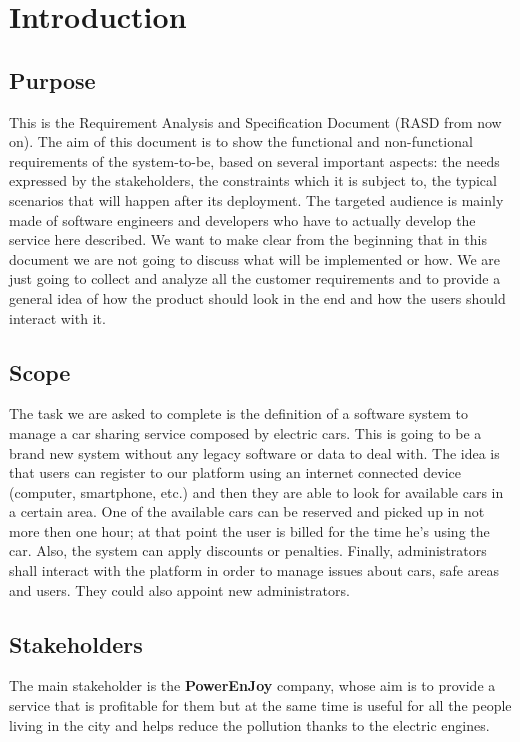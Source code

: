 \section{Introduction}

\subsection{Purpose}
    This is the Requirement Analysis and Specification Document (RASD from now on).
    The aim of this document is to show the functional and non-functional requirements
    of the system-to-be, based on several important aspects:
    the needs expressed by the stakeholders, the constraints which it is subject to,
    the typical scenarios that will happen after its deployment.
    The targeted audience is mainly made of software engineers and developers who have
    to actually develop the service here described.
    We want to make clear from the beginning that in this document we are not going to
    discuss what will be implemented or how. We are just going to collect and analyze
    all the customer requirements and to provide a general idea of how the product should
    look in the end and how the users should interact with it.

\subsection{Scope}
    The task we are asked to complete is the definition of a software system to manage a car sharing
    service composed by electric cars. This is going to be a brand new system without any
    legacy software or data to deal with. The idea is that users can register to our platform
    using an internet connected device (computer, smartphone, etc.) and then they are able to
    look for available cars in a certain area. 
    One of the available cars can be reserved and picked up in not more then one hour; at that
    point the user is billed for the time he's using the car.
    Also, the system can apply discounts or penalties.
    Finally, administrators shall interact with the platform in order to manage issues about cars, safe areas and users. They could also appoint new administrators.

\subsection{Stakeholders}
    The main stakeholder is the \textbf{PowerEnJoy} company, whose aim is to provide a service
    that is profitable for them but at the same time is useful for all the people living in the
    city and helps reduce the pollution thanks to the electric engines.

